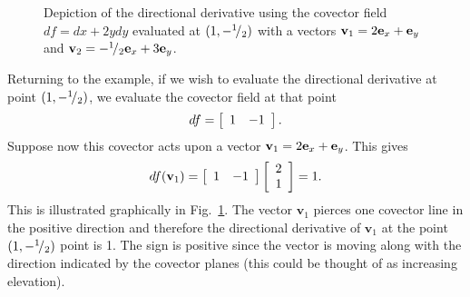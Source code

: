 \begin{figure}[!tb]
\begin{center}

\caption{Depiction of the directional derivative using the covector field $df = dx + 2y dy$ evaluated at $(1,-{}^{1}\!/_{2})$ with a vectors $\mathbf{v}_1 = 2 \mathbf{e}_x + \mathbf{e}_y$ and $\mathbf{v}_2 = -{}^{1}\!/_{2} \mathbf{e}_x + 3 \mathbf{e}_y$.}
\label{Fig:vector_covectorFieldExample_atPoint}
\end{center}
\end{figure}

Returning to the example, if we wish to evaluate the directional derivative at point $(1,-{}^{1}\!/_{2})$, we evaluate the covector field at that point
\begin{align}
  df = \left[ \begin{array}{c c} 1 & -1 \\ \end{array} \right] . \nonumber
\end{align}
Suppose now this covector acts upon a vector $\mathbf{v}_1 = 2 \mathbf{e}_x + \mathbf{e}_y$. This gives
\begin{align}
  df( \mathbf{v}_1 ) = \left[ \begin{array}{c c} 1 & -1 \\ \end{array} \right] 
  \left[ \begin{array}{c} 2 \\ 1 \\ \end{array} \right] = 1. \nonumber
\end{align}
This is illustrated graphically in Fig.~\ref{Fig:vector_covectorFieldExample_atPoint}. The vector $\mathbf{v}_1$ pierces one covector line in the positive direction and therefore the directional derivative of $\mathbf{v}_1$ at the point $(1,-{}^{1}\!/_{2})$ point is 1. The sign is positive since the vector is moving along with the direction indicated by the covector planes (this could be thought of as increasing elevation).

